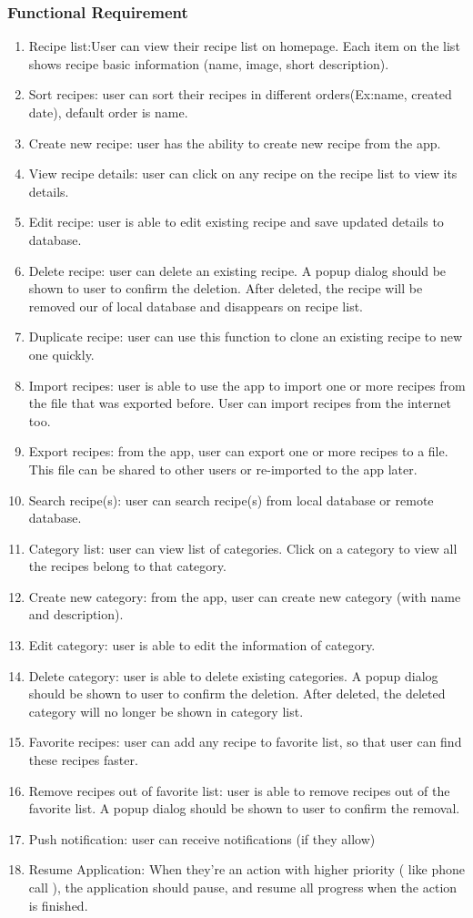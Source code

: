 \documentclass{article}
\begin{document}
\subsubsection{ Functional Requirement}
\begin{enumerate}
\item  Recipe list:User can view their recipe list on homepage. Each item on the list shows recipe basic information (name, image, short description). \\
\item Sort recipes: user can sort their recipes in different orders(Ex:name, created date), default order is name. 
\item Create new recipe: user has the ability to create new recipe from the app.
\item View recipe details: user can click on any recipe on the recipe list to view its details.
\item Edit recipe: user is able to edit existing recipe and save updated details to database.
\item Delete recipe: user can delete an existing recipe. A popup dialog should be shown to user to confirm the deletion. After deleted, the recipe will be removed our of local database and disappears on recipe list.
\item  Duplicate recipe: user can use this function to clone an existing recipe to new one quickly.
\item Import recipes: user is able to use the app to import one or more recipes from the file that was exported before. User can import recipes from the internet too.
\item Export recipes: from the app, user can export one or more recipes to a file. This file can be shared to other users or re-imported to the app later.
\item Search recipe(s): user can search recipe(s) from local database or remote database.
\item Category list: user can view list of categories. Click on a category to view all the recipes belong to that category.
\item Create new category: from the app, user can create new category (with name and description).
\item Edit category: user is able to edit the information of category.
\item Delete category: user is able to delete existing categories. A popup dialog should be shown to user to confirm the deletion. After deleted, the deleted category will no longer be shown in category list.
\item Favorite recipes: user can add any recipe to favorite list, so that user can find these recipes faster.
\item Remove recipes out of favorite list: user is able to remove recipes out of the favorite list. A popup dialog should be shown to user to confirm the removal.
\item Push notification: user can receive notifications (if they allow)
\item Resume Application: When they're an action with higher priority ( like phone call ), the application should pause, and resume all progress when the action is finished.


\end{enumerate}
\end{document}
